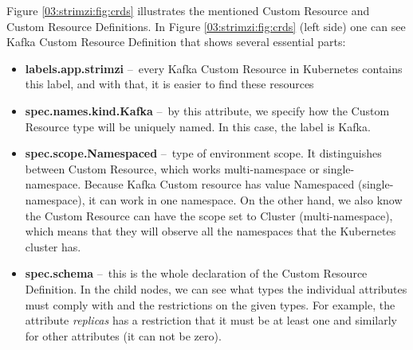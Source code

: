 Figure \ref{03:strimzi:fig:crds} illustrates the mentioned Custom Resource and Custom Resource Definitions.
In Figure \ref{03:strimzi:fig:crds} (left side) one can see Kafka Custom Resource Definition that shows several essential parts:
\begin{itemize}[itemsep=1mm, parsep=0pt]
    \item \textbf{labels.app.strimzi}  \---\ every Kafka Custom Resource in Kubernetes contains this label, and with that, it is easier to find these resources
    \item \textbf{spec.names.kind.Kafka} \---\ by this attribute, we specify how the Custom Resource type will be uniquely named.
    In this case, the label is Kafka.
    \item \textbf{spec.scope.Namespaced} \---\ type of environment scope.
    It distinguishes between Custom Resource, which works multi-namespace or single-namespace.
    Because Kafka Custom resource has value Namespaced (single-namespace), it can work in one namespace.
    On the other hand, we also know the Custom Resource can have the scope set to Cluster (multi-namespace), which means that they will observe all the namespaces that the Kubernetes cluster has.
    \item \textbf{spec.schema} \---\ this is the whole declaration of the Custom Resource Definition.
    In the child nodes, we can see what types the individual attributes must comply with and the restrictions on the given types.
    For example, the attribute \emph{replicas} has a restriction that it must be at least one and similarly for other attributes (it can not be zero).
   \end{itemize}

